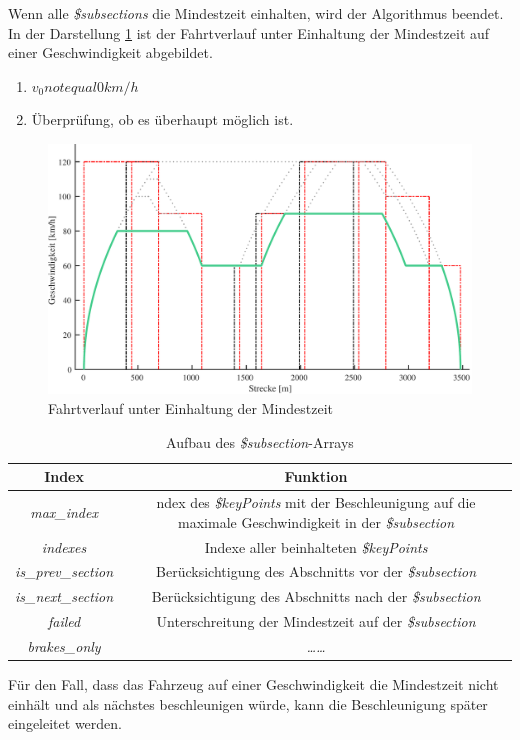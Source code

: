Wenn alle \textit{\$subsections} die Mindestzeit einhalten, wird der Algorithmus beendet. In der Darstellung \ref{fig:it9} ist der Fahrtverlauf unter Einhaltung der Mindestzeit auf einer Geschwindigkeit abgebildet.
\begin{enumerate}
\item $v_0 not equal 0 km/h$
\item Überprüfung, ob es überhaupt möglich ist.
\end{enumerate}
\begin{figure}
  \includegraphics[width=\linewidth]{../matlab/it9.pdf}
  \caption{Fahrtverlauf unter Einhaltung der Mindestzeit}
  \label{fig:it9}
\end{figure}
\begin{table}
\begin{center}
\renewcommand{\arraystretch}{1.2}
\begin{tabular}{c|c}
Index & Funktion \\ \hline
\textit{max\_index}                 &   \makecell{ndex des \textit{\$keyPoints} mit der Beschleunigung auf die\\maximale Geschwindigkeit in der \textit{\$subsection}}     \\ \hline
\textit{indexes}                 &    Indexe aller beinhalteten \textit{\$keyPoints}                  \\ \hline
\textit{is\_prev\_section}              &   Berücksichtigung des Abschnitts vor der \textit{\$subsection}     \\ \hline
\textit{is\_next\_section}                 &     Berücksichtigung des Abschnitts nach der \textit{\$subsection}                 \\ \hline
\textit{failed}                 &   Unterschreitung der Mindestzeit auf der \textit{\$subsection}     \\ \hline
\textit{brakes\_only}                    &   \textit{\dots\dots}                  \\
\end{tabular}
\renewcommand{\arraystretch}{1}
\caption{Aufbau des \textit{\$subsection}-Arrays}
\label{table:subsection}
\end{center}
\end{table}
Für den Fall, dass das Fahrzeug auf einer Geschwindigkeit die Mindestzeit nicht einhält und als nächstes beschleunigen würde, kann die Beschleunigung später eingeleitet werden. 
